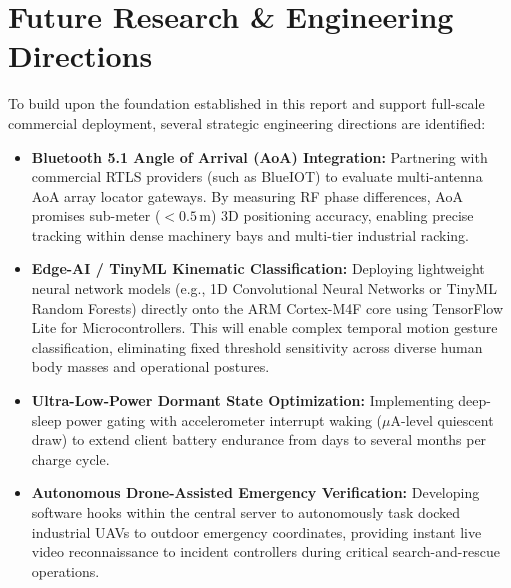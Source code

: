\section{Future Research \& Engineering Directions}
To build upon the foundation established in this report and support full-scale commercial deployment, several strategic engineering directions are identified:

\begin{itemize}
    \item \textbf{Bluetooth 5.1 Angle of Arrival (AoA) Integration:} Partnering with commercial RTLS providers (such as BlueIOT) to evaluate multi-antenna AoA array locator gateways. By measuring RF phase differences, AoA promises sub-meter ($<0.5\,\text{m}$) 3D positioning accuracy, enabling precise tracking within dense machinery bays and multi-tier industrial racking.
    \item \textbf{Edge-AI / TinyML Kinematic Classification:} Deploying lightweight neural network models (e.g., 1D Convolutional Neural Networks or TinyML Random Forests) directly onto the ARM Cortex-M4F core using TensorFlow Lite for Microcontrollers. This will enable complex temporal motion gesture classification, eliminating fixed threshold sensitivity across diverse human body masses and operational postures.
    \item \textbf{Ultra-Low-Power Dormant State Optimization:} Implementing deep-sleep power gating with accelerometer interrupt waking ($\mu\text{A}$-level quiescent draw) to extend client battery endurance from days to several months per charge cycle.
    \item \textbf{Autonomous Drone-Assisted Emergency Verification:} Developing software hooks within the central server to autonomously task docked industrial UAVs to outdoor emergency coordinates, providing instant live video reconnaissance to incident controllers during critical search-and-rescue operations.
\end{itemize}

